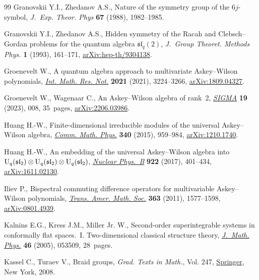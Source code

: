\documentclass[10pt,a4paper]{amsart}
\numberwithin{equation}{section}
\theoremstyle{definition}
\begin{document}
\begin{thebibliography}{99}
Granovskii Y.I., Zhedanov A.S., Nature of the symmetry group of the
 {$6j$}-symbol, \textit{J.~Exp. Theor. Phys} \textbf{67} (1988), 1982--1985.

Granovskii Y.I., Zhedanov A.S., Hidden symmetry of the {R}acah and
 {C}lebsch--{G}ordan problems for the quantum algebra $\mathfrak{sl}_q(2)$,
 \textit{J.~Group Theoret. Methods Phys.} \textbf{1} (1993), 161--171,
 \href{https://arxiv.org/abs/hep-th/9304138}{arXiv:hep-th/9304138}.

Groenevelt W., A quantum algebra approach to multivariate {A}skey--{W}ilson
 polynomials, \href{https://doi.org/10.1093/imrn/rnz182}{\textit{Int. Math. Res. Not.}} \textbf{2021} (2021), 3224--3266,
 \href{https://arxiv.org/abs/1809.04327}{arXiv:1809.04327}.

Groenevelt W., Wagenaar C., An {A}skey--{W}ilson algebra of rank~2,
 \href{https://doi.org/10.3842/SIGMA.2023.008}{\textit{SIGMA}} \textbf{19} (2023), 008, 35~pages, \href{https://arxiv.org/abs/2206.03986}{arXiv:2206.03986}.

Huang H.-W., Finite-dimensional irreducible modules of the universal
 {A}skey--{W}ilson algebra, \href{https://doi.org/10.1007/s00220-015-2467-9}{\textit{Comm. Math. Phys.}} \textbf{340} (2015),
 959--984, \href{https://arxiv.org/abs/1210.1740}{arXiv:1210.1740}.

Huang H.-W., An embedding of the universal {A}skey--{W}ilson algebra into
 {${\rm U}_q(\mathfrak{sl}_2)\otimes {\rm U}_q(\mathfrak{sl}_2)\otimes
 {\rm U}_q(\mathfrak{sl}_2)$}, \href{https://doi.org/10.1016/j.nuclphysb.2017.07.007}{\textit{Nuclear Phys.~B}} \textbf{922} (2017),
 401--434, \href{https://arxiv.org/abs/1611.02130}{arXiv:1611.02130}.

Iliev P., Bispectral commuting difference operators for multivariable
 {A}skey--{W}ilson polynomials, \href{https://doi.org/10.1090/S0002-9947-2010-05183-9}{\textit{Trans. Amer. Math. Soc.}} \textbf{363}
 (2011), 1577--1598, \href{https://arxiv.org/abs/0801.4939}{arXiv:0801.4939}.

Kalnins E.G., Kress J.M., Miller Jr. W., Second-order superintegrable systems
 in conformally flat spaces.~{I}. {T}wo-dimensional classical structure
 theory, \href{https://doi.org/10.1063/1.1897183}{\textit{J.~Math. Phys.}} \textbf{46} (2005), 053509, 28~pages.

Kassel C., Turaev V., Braid groups, \textit{Grad. Texts in Math.}, Vol. 247,
 \href{https://doi.org/10.1007/978-0-387-68548-9}{Springer}, New York, 2008.


\end{thebibliography}
\end{document}
